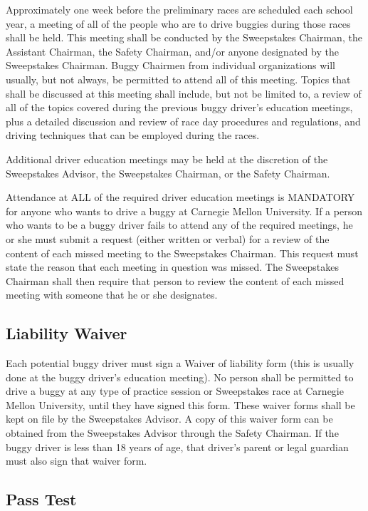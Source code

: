 	Approximately one week before the preliminary races are scheduled each school
	year, a meeting of all of the people who are to drive buggies during those
	races shall be held. This meeting shall be conducted by the Sweepstakes
	Chairman, the Assistant Chairman, the Safety Chairman, and/or anyone designated
	by the Sweepstakes Chairman. Buggy Chairmen from individual organizations will
	usually, but not always, be permitted to attend all of this meeting. Topics
	that shall be discussed at this meeting shall include, but not be limited to, a
	review of all of the topics covered during the previous buggy driver's
	education meetings, plus a detailed discussion and review of race day
	procedures and regulations, and driving techniques that can be employed during
	the races.

	Additional driver education meetings may be held at the discretion of the
	Sweepstakes Advisor, the Sweepstakes Chairman, or the Safety Chairman.

	Attendance at ALL of the required driver education meetings is MANDATORY for
	anyone who wants to drive a buggy at Carnegie Mellon University. If a person
	who wants to be a buggy driver fails to attend any of the required meetings, he
	or she must submit a request (either written or verbal) for a review of the
	content of each missed meeting to the Sweepstakes Chairman. This request must
	state the reason that each meeting in question was missed. The Sweepstakes
	Chairman shall then require that person to review the content of each missed
	meeting with someone that he or she designates.

\subsection{Liability Waiver}

	Each potential buggy driver must sign a Waiver of liability form (this is
	usually done at the buggy driver's education meeting). No person shall be
	permitted to drive a buggy at any type of practice session or Sweepstakes race
	at Carnegie Mellon University, until they have signed this form. These waiver
	forms shall be kept on file by the Sweepstakes Advisor. A copy of this waiver
	form can be obtained from the Sweepstakes Advisor through the Safety Chairman.
	If the buggy driver is less than 18 years of age, that driver's parent or legal
	guardian must also sign that waiver form.

\subsection{Pass Test}

